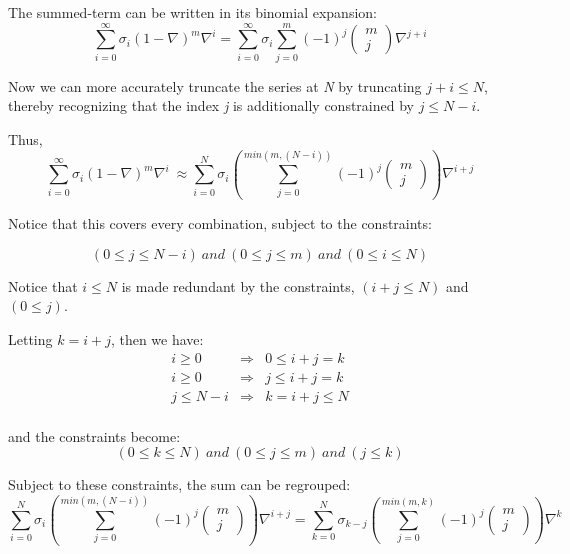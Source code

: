 The summed-term can be written in its binomial expansion:
\begin{equation*}
\sum _{i=0}^{\infty}\sigma_{i}(1-\nabla )^{m}\nabla ^{i} = 
\sum _{i=0}^{\infty}\sigma_{i}
\sum_{j=0}^{m}(-1)^{j}\left(\begin{matrix}m\\j\end{matrix}\right)\nabla ^{j+i}
\end{equation*}

Now we can more accurately truncate the series at \textit{N} by truncating
$j+i \leqslant N$, thereby recognizing that the index \textit{j} is
additionally constrained by  $j\leqslant N-i$.

Thus,
\begin{equation*}
\sum _{i=0}^{\infty}\sigma _{i}(1-\nabla )^{m}\nabla ^{i}\ \approx 
\sum_{i=0}^{N}\sigma_{i}
\left(\sum_{j=0}^{min(m,(N-i))}(-1)^{j}
\left(\begin{matrix}m\\j\end{matrix}\right)
\right)
\nabla ^{i+j}
\end{equation*}

Notice that this covers every combination, subject to the constraints:

\begin{equation*}
(0\leqslant j\leqslant N-i)\ and\ (0\leqslant j\leqslant m)\ and\ 
(0\leqslant i\leqslant N)
\end{equation*}

Notice that  $i\leqslant N$ is made redundant by the
constraints, $(i+j\leqslant N)$ and $(0\leqslant j)$.

Letting  $k=i+j$, then we have:
\begin{eqnarray*}
i \geqslant 0 &\Rightarrow & 0\leqslant i+j = k \\
i \geqslant 0 &\Rightarrow & j\leqslant i+j = k \\
j \leqslant N-i &\Rightarrow & k = i+j \leqslant N \\
\end{eqnarray*}

and the constraints become:
\begin{equation*}
(0\leqslant k\leqslant N)\ and\ (0\leqslant j\leqslant m)\ and\ (j\leqslant k) 
\end{equation*}



Subject to these constraints, the sum can be regrouped:
\begin{equation*}
\sum_{i=0}^{N}\sigma_{i}
\left(\sum_{j=0}^{min(m,(N-i))}(-1)^{j}
\left(\begin{matrix}m\\j\end{matrix}\right)
\right)
\nabla ^{i+j} =
\sum_{k=0}^{N}\sigma_{k-j}
\left(\sum_{j=0}^{min(m,k)}(-1)^{j}
\left(\begin{matrix}m\\j\end{matrix}\right)
\right)
\nabla ^{k}
\end{equation*}

